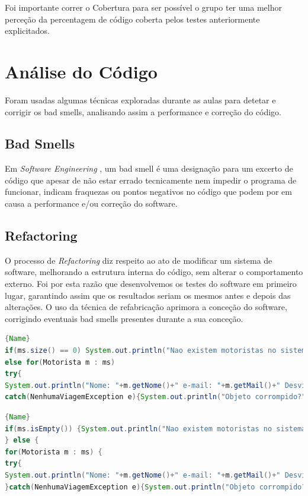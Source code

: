 Foi importante correr o Cobertura para ser possível o grupo ter uma melhor perceção da percentagem de código coberta pelos testes anteriormente explicitados.

\section{Análise do Código}

Foram usadas algumas técnicas exploradas durante as aulas para detetar e corrigir os bad smells, analisando assim a performance e correção do código.

\subsection{Bad Smells}

Em \emph{Software Engineering} , um bad smell é uma designação para um excerto de código que apesar de não estar errado tecnicamente nem impedir o programa de funcionar, indicam fraquezas ou pontos negativos no código que podem por em causa a performance e/ou correção do software.

\newpage

\subsection{Refactoring}
\label{refactor}
O processo de \emph{Refactoring} diz respeito ao ato de modificar um sistema de software, melhorando a estrutura interna do código, sem alterar o comportamento externo. Foi por esta razão que desenvolvemos os testes do software em primeiro lugar, garantindo assim que os resultados seriam os mesmos antes e depois das alterações.
O uso da técnica de refabricação aprimora a conceção do software, corrigindo eventuais bad smells presentes durante a sua conceção.

\noindent\begin{minipage}{.45\textwidth}
\begin{lstlisting}[breaklines,caption=Original,frame=tlrb,language=java]{Name}
if(ms.size() == 0) System.out.println("Nao existem motoristas no sistema UMeR.");
else for(Motorista m : ms)
try{
System.out.println("Nome: "+m.getNome()+" e-mail: "+m.getMail()+" Desvio: "+String.format("\%.2f",m.maiorDesvio().getDesvio()));}
catch(NenhumaViagemException e){System.out.println("Objeto corrompido?");}}
\end{lstlisting}
\end{minipage}\hfill
\begin{minipage}{.45\textwidth}
\begin{lstlisting}[breaklines,caption=Refactored,frame=tlrb,language=java]{Name}
if(ms.isEmpty()) {System.out.println("Nao existem motoristas no sistema UMeR.");
} else {
for(Motorista m : ms) {
try{
System.out.println("Nome: "+m.getNome()+" e-mail: "+m.getMail()+" Desvio: "+String.format("\%.2f",m.maiorDesvio().getDesvio()));
}catch(NenhumaViagemException e){System.out.println("Objeto corrompido?");}}}}
\end{lstlisting}
\label{exemplo}
\end{minipage}

